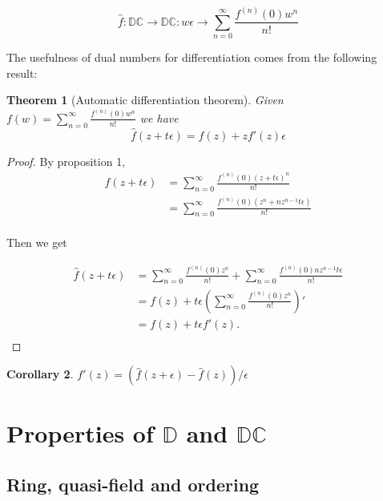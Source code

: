 \documentclass{article}
\newtheorem{theorem}{Theorem}
\newtheorem{corollary}[theorem]{Corollary}
\newcommand{\D}{\mathbb{D}}
\newcommand{\DC}{\mathbb{DC}}
\newcommand{\e}{\epsilon}
\begin{document}
\begin{equation}
        \hat{f}: \DC \to \DC: w \e \to \sum_{n=0}^\infty \frac{f^{(n)}(0) w^n}{n!}
\end{equation}

The usefulness of dual numbers for differentiation comes from the following result:

\begin{theorem}[Automatic differentiation theorem]
        Given $f(w) = \sum_{n=0}^\infty \frac{f^{(n)}(0) w^n}{n!}$ we have
\begin{equation}
        \hat{f}(z + t\e) = f(z) + z f'(z) \e
\end{equation}
\end{theorem}
\begin{proof}
By proposition 1,
\begin{equation}
\begin{split}
        \hat{f}(z + t \e) &= \sum_{n=0}^\infty \frac{f^{(n)}(0) (z + t\e)^n}{n!} \\
                          &= \sum_{n=0}^\infty \frac{f^{(n)}(0) (z^n + nz^{n-1}t\e)}{n!} \\
\end{split}
\end{equation}

Then we get

\begin{equation}
\begin{split}
        \hat{f}(z + t \e) &= \sum_{n=0}^\infty \frac{f^{(n)}(0) z^n}{n!} + \sum_{n=0}^\infty \frac{f^{(n)}(0) nz^{n-1}t\e}{n!} \\
                          &= f(z) + t \e (\sum_{n=0}^\infty \frac{f^{(n)}(0) z^n}{n!})' \\
                          &= f(z) + t \e f'(z). \\
\end{split}
\end{equation}

\end{proof}

\begin{corollary}
$f'(z) = (\hat{f}(z+\e) - \hat{f}(z))/\e$
\end{corollary}

\section{Properties of $\D$ and $\DC$}

\subsection{Ring, quasi-field and ordering}
\end{document}
